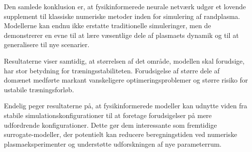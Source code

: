 Den samlede konklusion er, at fysikinformerede neurale netværk udgør et lovende supplement til klassiske numeriske metoder inden for simulering af randplasma. Modellerne kan endnu ikke erstatte traditionelle simuleringer, men de demonstrerer en evne til at lære væsentlige dele af plasmaets dynamik og til at generalisere til nye scenarier.

Resultaterne viser samtidig, at størrelsen af det område, modellen skal forudsige, har stor betydning for træningsstabiliteten. Forudsigelse af større dele af domænet medførte markant vanskeligere optimeringsproblemer og større risiko for ustabile træningsforløb.

Endelig peger resultaterne på, at fysikinformerede modeller kan udnytte viden fra stabile simulationskonfigurationer til at foretage forudsigelser på mere udfordrende konfigurationer. Dette gør dem interessante som fremtidige surrogate-modeller, der potentielt kan reducere beregningstiden ved numeriske plasmaeksperimenter og understøtte udforskningen af nye parameterrum.